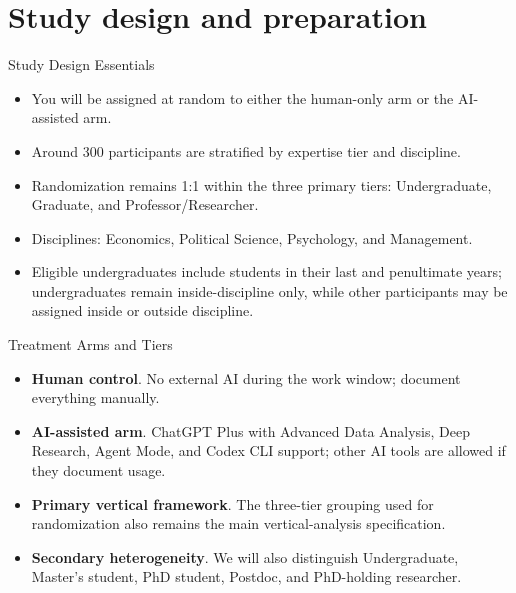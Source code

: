 \documentclass[aspectratio=169,professionalfonts]{beamer}
\begin{document}
\section{Study design and preparation}

\begin{frame}{Study Design Essentials}
  \begin{itemize}
    \item You will be assigned at random to either the human-only arm or the AI-assisted arm.
    \item Around 300 participants are stratified by expertise tier and discipline.
    \item Randomization remains 1:1 within the three primary tiers: Undergraduate, Graduate, and Professor/Researcher.
    \item Disciplines: Economics, Political Science, Psychology, and Management.
    \item Eligible undergraduates include students in their last and penultimate years; undergraduates remain inside-discipline only, while other participants may be assigned inside or outside discipline.
  \end{itemize}
\end{frame}

\begin{frame}{Treatment Arms and Tiers}
  \begin{itemize}
    \item \textbf{Human control}. No external AI during the work window; document everything manually.
    \item \textbf{AI-assisted arm}. ChatGPT Plus with Advanced Data Analysis, Deep Research, Agent Mode, and Codex CLI support; other AI tools are allowed if they document usage.
    \item \textbf{Primary vertical framework}. The three-tier grouping used for randomization also remains the main vertical-analysis specification.
    \item \textbf{Secondary heterogeneity}. We will also distinguish Undergraduate, Master's student, PhD student, Postdoc, and PhD-holding researcher.
  \end{itemize}
\end{frame}
\end{document}

